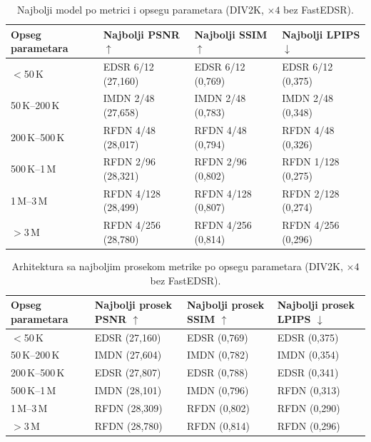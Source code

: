 
\begin{table}[H]
    \centering
    \caption{Najbolji model po metrici i opsegu parametara (DIV2K, $\times4$ bez FastEDSR).}
    \label{tab:param_bins_best_model_4x_DIV2K}
    \small
    \setlength{\tabcolsep}{4pt}
    \begin{tabular}{@{}llll@{}}
        \toprule
        Opseg parametara & Najbolji PSNR $\uparrow$ & Najbolji SSIM $\uparrow$ & Najbolji LPIPS $\downarrow$ \\
        \midrule
        $<$50\,K & EDSR 6/12 (27,160) & EDSR 6/12 (0,769) & EDSR 6/12 (0,375) \\
        50\,K--200\,K & IMDN 2/48 (27,658) & IMDN 2/48 (0,783) & IMDN 2/48 (0,348) \\
        200\,K--500\,K & RFDN 4/48 (28,017) & RFDN 4/48 (0,794) & RFDN 4/48 (0,326) \\
        500\,K--1\,M & RFDN 2/96 (28,321) & RFDN 2/96 (0,802) & RFDN 1/128 (0,275) \\
        1\,M--3\,M & RFDN 4/128 (28,499) & RFDN 4/128 (0,807) & RFDN 2/128 (0,274) \\
        $>$3\,M & RFDN 4/256 (28,780) & RFDN 4/256 (0,814) & RFDN 4/256 (0,296) \\
        \bottomrule
    \end{tabular}
\end{table}

\begin{table}[H]
    \centering
    \caption{Arhitektura sa najboljim prosekom metrike po opsegu parametara (DIV2K, $\times4$ bez FastEDSR).}
    \label{tab:param_bins_best_arch_4x_DIV2K}
    \small
    \setlength{\tabcolsep}{4pt}
    \begin{tabular}{@{}llll@{}}
        \toprule
        Opseg parametara & Najbolji prosek PSNR $\uparrow$ & Najbolji prosek SSIM $\uparrow$ & Najbolji prosek LPIPS $\downarrow$ \\
        \midrule
        $<$50\,K & EDSR (27,160) & EDSR (0,769) & EDSR (0,375) \\
        50\,K--200\,K & IMDN (27,604) & IMDN (0,782) & IMDN (0,354) \\
        200\,K--500\,K & EDSR (27,807) & EDSR (0,788) & EDSR (0,341) \\
        500\,K--1\,M & IMDN (28,101) & IMDN (0,796) & RFDN (0,313) \\
        1\,M--3\,M & RFDN (28,309) & RFDN (0,802) & RFDN (0,290) \\
        $>$3\,M & RFDN (28,780) & RFDN (0,814) & RFDN (0,296) \\
        \bottomrule
    \end{tabular}
\end{table}

